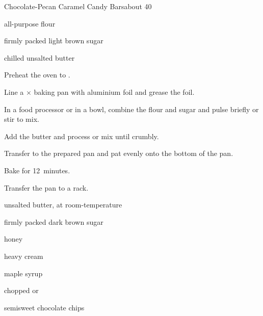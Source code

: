 \begin{recipe}{Chocolate-Pecan Caramel Candy Bars}{}{about 40}


\begin{ingredients}
\item \C{1 \half} all-purpose flour
\item \C{\half} firmly packed light brown sugar
\item \C{\half} chilled unsalted butter
\end{ingredients}

\begin{directions}
\item Preheat the oven to .
\item Line a $\times$ baking pan with aluminium foil and grease the foil.
\item In a food processor or in a bowl, combine the flour and sugar and pulse briefly or stir to mix.
\item Add the butter and process or mix until crumbly.
\item Transfer to the prepared pan and pat evenly onto the bottom of the pan.
\item Bake for 12~minutes.
\item Transfer the pan to a rack.
\end{directions}


\begin{ingredients}
\item {} unsalted butter, at room-temperature
\item {} firmly packed dark brown sugar
\item {} honey
\item {} heavy cream
\item {} maple syrup
\item \C{1 \half} chopped  or 
\item \C{\half} semisweet chocolate chips
\end{ingredients}


\end{recipe}
